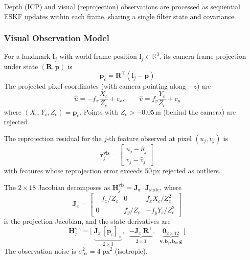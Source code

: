 Depth (ICP) and visual (reprojection) observations are processed as sequential ESKF updates within each frame, sharing a single filter state and covariance.

\subsubsection{Visual Observation Model}

For a landmark $\mathbf{l}_j$ with world-frame position $\mathbf{l}_j \in \mathbb{R}^3$, its camera-frame projection under state $(\mathbf{R}, \mathbf{p})$ is
\begin{equation}
    \mathbf{p}_c = \mathbf{R}^\top(\mathbf{l}_j - \mathbf{p})
    \label{eq:world_to_cam}
\end{equation}
The projected pixel coordinates (with camera pointing along $-z$) are
\begin{equation}
    \hat{u} = -f_x \frac{X_c}{Z_c} + c_x, \qquad
    \hat{v} = f_y \frac{Y_c}{Z_c} + c_y
    \label{eq:projection}
\end{equation}
where $(X_c, Y_c, Z_c) = \mathbf{p}_c$. Points with $Z_c > -0.05$\,m (behind the camera) are rejected.

The reprojection residual for the $j$-th feature observed at pixel $(u_j, v_j)$ is
\begin{equation}
    \mathbf{r}_j^\text{vis} = \begin{bmatrix} u_j - \hat{u}_j \\ v_j - \hat{v}_j \end{bmatrix}
    \label{eq:vis_residual}
\end{equation}
with features whose reprojection error exceeds 50\,px rejected as outliers.

The $2 \times 18$ Jacobian decomposes as $\mathbf{H}_j^\text{vis} = \mathbf{J}_\pi \cdot \mathbf{J}_\text{state}$, where
\begin{equation}
    \mathbf{J}_\pi = \begin{bmatrix}
        -f_x/Z_c & 0 & f_x X_c/Z_c^2 \\
        0 & f_y/Z_c & -f_y Y_c/Z_c^2
    \end{bmatrix}
    \label{eq:J_proj}
\end{equation}
is the projection Jacobian, and the state derivatives are
\begin{equation}
    \mathbf{H}_j^\text{vis} = \bigl[\;
        \underbrace{\mathbf{J}_\pi\,[\mathbf{p}_c]_\times}_{2 \times 3},\;\;
        \underbrace{-\mathbf{J}_\pi\,\mathbf{R}^\top}_{2 \times 3},\;\;
        \underbrace{\mathbf{0}_{2 \times 12}}_{\mathbf{v},\mathbf{b}_g,\mathbf{b}_a,\mathbf{g}}
    \;\bigr]
    \label{eq:H_visual}
\end{equation}
The observation noise is $\sigma_\text{px}^2 = 4\;\text{px}^2$ (isotropic).

